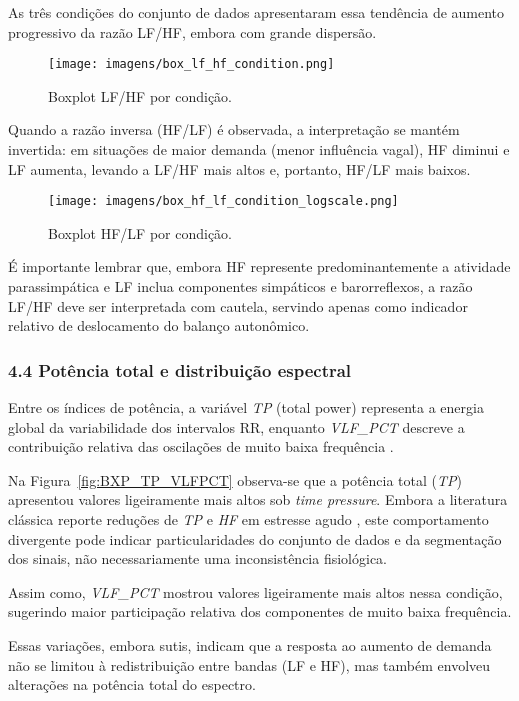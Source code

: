 \documentclass[conference]{IEEEtran}
\begin{document}
As três condições do conjunto de dados apresentaram essa tendência de aumento progressivo da razão LF/HF, embora com grande dispersão. 

\begin{figure}[H]
    \centering
    \texttt{[image: imagens/box\_lf\_hf\_condition.png]}
    \caption{Boxplot LF/HF por condição.}
    \label{fig:lfhf_box}
\end{figure}

Quando a razão inversa (HF/LF) é observada, a interpretação se mantém invertida: em situações de maior demanda (menor influência vagal), HF diminui e LF aumenta, levando a LF/HF mais altos e, portanto, HF/LF mais baixos.

\begin{figure}[H]
    \centering
    \texttt{[image: imagens/box\_hf\_lf\_condition\_logscale.png]}
    \caption{Boxplot HF/LF por condição.}
    \label{fig:lfhf_box}
\end{figure}

É importante lembrar que, embora HF represente predominantemente a atividade parassimpática e LF inclua componentes simpáticos e barorreflexos, a razão LF/HF deve ser interpretada com cautela, servindo apenas como indicador relativo de deslocamento do balanço autonômico.

\subsubsection*{4.4 Potência total e distribuição espectral}

Entre os índices de potência, a variável \textit{TP} (total power) representa a energia global da variabilidade dos intervalos RR, enquanto \textit{VLF\_PCT} descreve a contribuição relativa das oscilações de muito baixa frequência \cite{R3}. 

Na Figura~\ref{fig:BXP_TP_VLFPCT} observa-se que a potência total (\textit{TP}) apresentou valores ligeiramente mais altos sob \textit{time pressure}. 
Embora a literatura clássica reporte reduções de \textit{TP} e \textit{HF} em estresse agudo \cite{R1}, este comportamento divergente pode indicar particularidades do conjunto de dados e da segmentação dos sinais, não necessariamente uma inconsistência fisiológica. 

Assim como, \textit{VLF\_PCT} mostrou valores ligeiramente mais altos nessa condição, sugerindo maior participação relativa dos componentes de muito baixa frequência.

Essas variações, embora sutis, indicam que a resposta ao aumento de demanda não se limitou à redistribuição entre bandas (LF e HF), mas também envolveu alterações na potência total do espectro.
\end{document}
